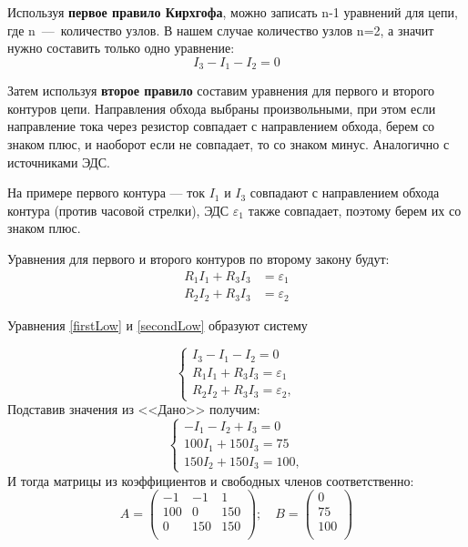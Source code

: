 \documentclass[14pt,a4paper]{article}
\begin{document}
Используя \textbf{первое правило Кирхгофа}, можно записать n-1 уравнений для цепи, где n~---~количество узлов. В нашем случае количество узлов n=2, а значит нужно составить только одно уравнение:
\begin{equation} \label{firstLow}
    I_3 -I_1 - I_2 = 0
\end{equation}

Затем используя \textbf{второе правило} составим уравнения для первого и второго контуров цепи. Направления обхода выбраны произвольными, при этом если направление тока через резистор совпадает с направлением обхода, берем со знаком плюс, и наоборот если не совпадает, то со знаком минус. Аналогично с источниками ЭДС.

На примере первого контура --- ток $I_1$ и $I_3$ совпадают с направлением обхода контура (против часовой стрелки), ЭДС $\varepsilon_1$ также совпадает, поэтому берем их со знаком плюс.

Уравнения для первого и второго контуров по второму закону будут:
\begin{equation} \label{secondLow}
    \begin{split}
        R_1I_1 + R_3I_3 & = \varepsilon_1 \\
        R_2I_2 +R_3I_3 & = \varepsilon_2
    \end{split}
\end{equation}

Уравнения \ref{firstLow} и \ref{secondLow} образуют систему

\begin{equation}
    \begin{cases}
        I_3 -I_1 - I_2 = 0\\
        R_1I_1 + R_3I_3 = \varepsilon_1 \\
        R_2I_2 +R_3I_3 = \varepsilon_2,
    \end{cases}
\end{equation}
Подставив значения из <<Дано>> получим:
\begin{equation}
    \begin{cases}
        -I_1 -I_2 + I_3 = 0\\
        100I_1 + 150I_3 = 75 \\
        150I_2 + 150I_3 = 100,
    \end{cases}
\end{equation}
И тогда матрицы из коэффициентов и свободных членов соответственно:
\begin{equation}
    A = \begin{pmatrix}
        -1 & -1   & 1   \\
        100 & 0   & 150  \\
        0 & 150   & 150  \\
    \end{pmatrix}; \quad B =
    \begin{pmatrix}
        0  \\
        75  \\
        100 \\
    \end{pmatrix}
\end{equation}
\progress{}
\end{document}
